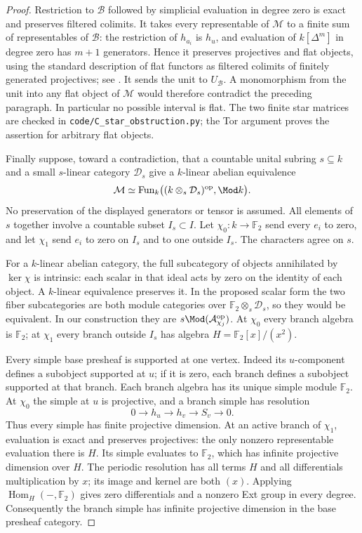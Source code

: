 \begin{proof}
Restriction to $\mathcal B$ followed by simplicial evaluation in degree zero is exact and preserves filtered colimits. It takes every representable of $\mathcal M$ to a finite sum of representables of $\mathcal B$: the restriction of $h_{a_i}$ is $h_u$, and evaluation of $k[\Delta^m]$ in degree zero has $m+1$ generators. Hence it preserves projectives and flat objects, using the standard description of flat functors as filtered colimits of finitely generated projectives; see \citet[p.~5]{Krause2016C}. It sends the unit to $U_{\mathcal B}$. A monomorphism from the unit into any flat object of $\mathcal M$ would therefore contradict the preceding paragraph. In particular no possible interval is flat. The two finite star matrices are checked in \texttt{code/C\_star\_obstruction.py}; the Tor argument proves the assertion for arbitrary flat objects.

Finally suppose, toward a contradiction, that a countable unital subring $s\subseteq k$ and a small $s$-linear category $\mathcal D_s$ give a $k$-linear abelian equivalence
\[
 \mathcal M\simeq
 \operatorname{Fun}_k\bigl((k\otimes_s\mathcal D_s)^{\mathrm{op}},\Mod k\bigr).
\]
No preservation of the displayed generators or tensor is assumed. All elements of $s$ together involve a countable subset $I_s\subset I$. Let $\chi_0:k\to\mathbb F_2$ send every $e_i$ to zero, and let $\chi_1$ send $e_i$ to zero on $I_s$ and to one outside $I_s$. The characters agree on $s$.

For a $k$-linear abelian category, the full subcategory of objects annihilated by $\ker\chi$ is intrinsic: each scalar in that ideal acts by zero on the identity of each object. A $k$-linear equivalence preserves it. In the proposed scalar form the two fiber subcategories are both module categories over $\mathbb F_2\otimes_s\mathcal D_s$, so they would be equivalent. In our construction they are $s\Mod(\mathcal A_{\chi_j}^{\mathrm{op}})$. At $\chi_0$ every branch algebra is $\mathbb F_2$; at $\chi_1$ every branch outside $I_s$ has algebra $H=\mathbb F_2[x]/(x^2)$.

Every simple base presheaf is supported at one vertex. Indeed its $u$-component defines a subobject supported at $u$; if it is zero, each branch defines a subobject supported at that branch. Each branch algebra has its unique simple module $\mathbb F_2$. At $\chi_0$ the simple at $u$ is projective, and a branch simple has resolution
\[
 0\longrightarrow h_u\longrightarrow h_v\longrightarrow S_v\longrightarrow0.
\]
Thus every simple has finite projective dimension. At an active branch of $\chi_1$, evaluation is exact and preserves projectives: the only nonzero representable evaluation there is $H$. Its simple evaluates to $\mathbb F_2$, which has infinite projective dimension over $H$. The periodic resolution has all terms $H$ and all differentials multiplication by $x$; its image and kernel are both $(x)$. Applying $\operatorname{Hom}_H(-,\mathbb F_2)$ gives zero differentials and a nonzero Ext group in every degree. Consequently the branch simple has infinite projective dimension in the base presheaf category.


\end{proof}
